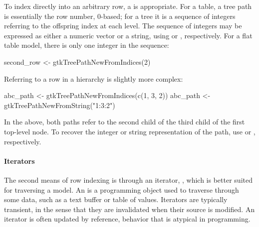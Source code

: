 To index directly into an arbitrary row, a  is
appropriate. For a table, a tree path is essentially the row number,
$0$-based; for a tree it is a sequence of integers referring to the
offspring index at each level. The sequence of integers may be
expressed as either a numeric vector or a string, using
 or
, respectively. For a flat table
model, there is only one integer in the sequence:
\begin{Schunk}
\begin{Sinput}
 second_row <- gtkTreePathNewFromIndices(2)
\end{Sinput}
\end{Schunk}
%
Referring to a row in a hierarchy is slightly more complex:
\begin{Schunk}
\begin{Sinput}
 abc_path <- gtkTreePathNewFromIndices(c(1, 3, 2))
 abc_path <- gtkTreePathNewFromString("1:3:2")
\end{Sinput}
\end{Schunk}
%
In the above, both paths refer to the second child of the third child
of the first top-level node. To recover the integer or string
representation of the path, use  or
, respectively.

\paragraph{Iterators}
 The second means of row indexing is through an
iterator, , which is better suited for traversing a
model.  An  is a programming object used to traverse through some data, such as a text buffer
or table of values. Iterators are typically transient, in the sense
that they are invalidated when their source is modified. An iterator
is often updated by reference, behavior that is
atypical in \R\/ programming.


